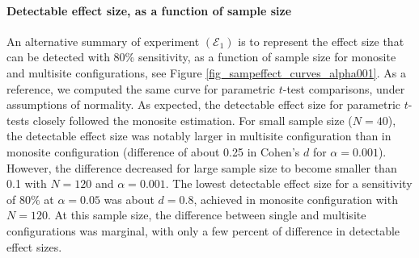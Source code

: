 \documentclass[authoryear]{elsarticle}
\begin{document}
\paragraph{Detectable effect size, as a function of sample size} An alternative summary of experiment $(\mathcal{E}_1)$ is to represent the effect size that can be detected with 80\% sensitivity, as a function of sample size for monosite and multisite configurations, see Figure \ref{fig_sampeffect_curves_alpha001}. As a reference, we computed the same curve for parametric $t$-test comparisons, under assumptions of normality. As expected, the detectable effect size for parametric $t$-tests closely followed the monosite estimation. For small sample size ($N=40$), the detectable effect size was notably larger in multisite configuration than in monosite configuration (difference of about 0.25 in Cohen's $d$ for $\alpha=0.001$). However, the difference decreased for large sample size to become smaller than 0.1 with $N=120$ and $\alpha=0.001$. The lowest detectable effect size for a sensitivity of $80\%$ at $\alpha=0.05$ was about $d=0.8$, achieved in monosite configuration with $N=120$. At this sample size, the difference between single and multisite configurations was marginal, with only a few percent of difference in detectable effect sizes. 
\end{document}
